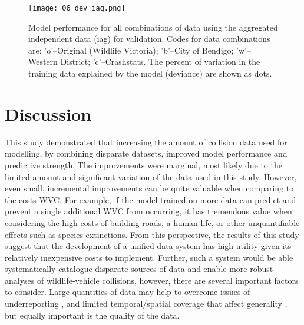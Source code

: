 \begin{figure*}[htp]
  \centering
  \texttt{[image: 06\_dev\_iag.png]}
  \caption[Model discrimination ability for all combinations of training data using the aggregated independent data for validation]{Model performance for all combinations of data using the aggregated independent data (iag) for validation. Codes for data combinations are: 'o'--Original (Wildlife Victoria); 'b'--City of Bendigo; 'w'--Western District; 'c'--Crashstats. The percent of variation in the training data explained by the model (deviance) are shown as dots.}
  \label{val_calib_dev}
\end{figure*}

\section{Discussion}

This study demonstrated that increasing the amount of collision data used for modelling, by combining disparate datasets, improved model performance and predictive strength. The improvements were marginal, most likely due to the limited amount and significant variation of the data used in this study. However, even small, incremental improvements can be quite valuable when comparing to the costs WVC. For example, if the model trained on more data can predict and prevent a single additional WVC from occurring, it has tremendous value when considering the high costs of building roads, a human life, or other unquantifiable effects such as species extinctions. From this perspective, the results of this study suggest that the development of a unified data system has high utility given its relatively inexpensive costs to implement. Further, such a system would be able systematically catalogue disparate sources of data and enable more robust analyses of wildlife-vehicle collisions, however, there are several important factors to consider. Large quantities of data may help to overcome issues of underreporting \citep{snow15}, and limited temporal/spatial coverage that affect generality \citep{clev15}, but equally important is the quality of the data.

